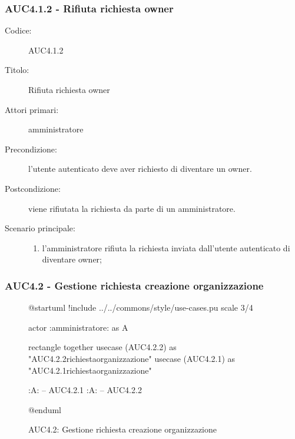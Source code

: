\documentclass[casi-duso]{subfiles}
\begin{document}
\subsubsection{AUC4.1.2 - Rifiuta richiesta owner}%
\label{subsub:AUC4.1.2}
\begin{description}
  \item[Codice:] AUC4.1.2
  \item[Titolo:] Rifiuta richiesta owner
  \item[Attori primari:] amministratore
  \item[Precondizione:] l'utente autenticato deve aver richiesto di diventare un owner.
  \item[Postcondizione:] viene rifiutata la richiesta da parte di un amministratore.
  \item[Scenario principale:]
  \begin{enumerate}
    \item l'amministratore rifiuta la richiesta inviata dall'utente autenticato di diventare owner;
  \end{enumerate}
\end{description}

\subsubsection{AUC4.2 - Gestione richiesta creazione organizzazione}%
\label{subsub:AUC4.2}

\begin{figure}[h!] 
  \centering 
  \begin{plantuml}
  @startuml
  !include ../../commons/style/use-cases.pu
  scale 3/4

  actor :amministratore: as A

  rectangle {
    together {
      usecase (AUC4.2.2) as "AUC4.2.2\nRifiuta richiesta\ncreazione organizzazione"
      usecase (AUC4.2.1) as "AUC4.2.1\nAccetta richiesta\ncreazione organizzazione"
    }
  }

  :A: -- AUC4.2.1
  :A: -- AUC4.2.2

  @enduml
  \end{plantuml} 
  \caption{AUC4.2: Gestione richiesta creazione organizzazione} 
  \label{fig:auc4_2} 
\end{figure}
\end{document}
